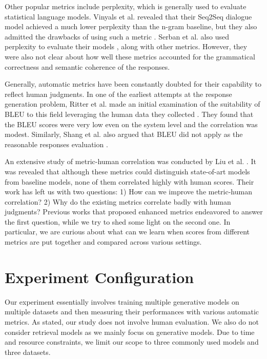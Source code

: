 \documentclass[runningheads]{llncs}
\begin{document}
    Other popular metrics include perplexity, which is generally used to evaluate statistical language models. Vinyals et al. revealed that their Seq2Seq dialogue model achieved a much lower perplexity than the n-gram baseline, but they also admitted the drawbacks of using such a metric \cite{GoogleChatbot}. Serban et al. also used perplexity to evaluate their models \cite{HRED}, along with other metrics. However, they were also not clear about how well these metrics accounted for the grammatical correctness and semantic coherence of the responses.

    Generally, automatic metrics have been constantly doubted for their capability to reflect human judgments. In one of the earliest attempts at the response generation problem, Ritter et al. made an initial examination of the suitability of BLEU to this field leveraging the human data they collected \cite{Ritter11}. They found that the BLEU scores were very low even on the system level and the correlation was modest. Similarly, Shang et al. also argued that BLEU did not apply as the reasonable responses evaluation \cite{Shang}.

    An extensive study of metric-human correlation was conducted by Liu et al. \cite{HowNot}. It was revealed that although these metrics could distinguish state-of-art models from baseline models, none of them correlated highly with human scores. Their work has left us with two questions: 1) How can we improve the metric-human correlation? 2) Why do the existing metrics correlate badly with human judgments? Previous works that proposed enhanced metrics endeavored to answer the first question, while we try to shed some light on the second one. In particular, we are curious about what can we learn when scores from different metrics are put together and compared across various settings.

    \section{Experiment Configuration}
    Our experiment essentially involves training multiple generative models on multiple datasets and then measuring their performances with various automatic metrics. As stated, our study does not involve human evaluation. We also do not consider retrieval models as we mainly focus on generative models. Due to time and resource constraints, we limit our scope to three commonly used models and three datasets.
\end{document}
